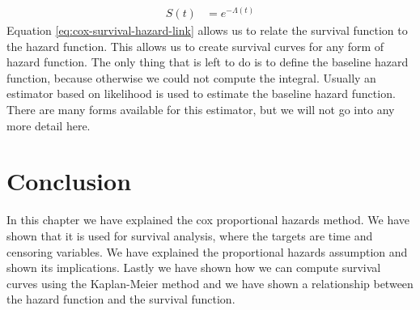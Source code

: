 \begin{equation}
\begin{split}
\label{eq:cox-survival-hazard-link}
S(t) &= e^{-\Lambda(t)}
\end{split}
\end{equation}
Equation \ref{eq:cox-survival-hazard-link} allows us to relate the survival function to the hazard function. This allows us to create survival curves for any form of hazard function. The only thing that is left to do is to define the baseline hazard function, because otherwise we could not compute the integral. Usually an estimator based on likelihood is used to estimate the baseline hazard function. There are many forms available for this estimator\cite{royston2011estimating}, but we will not go into any more detail here.

\section{Conclusion}
\label{sec:cox-conclusion}
In this chapter we have explained the cox proportional hazards method. We have shown that it is used for survival analysis, where the targets are time and censoring variables. We have explained the proportional hazards assumption and shown its implications. Lastly we have shown how we can compute survival curves using the Kaplan-Meier method and we have shown a relationship between the hazard function and the survival function.
